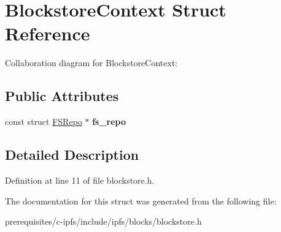 \hypertarget{struct_blockstore_context}{}\section{Blockstore\+Context Struct Reference}
\label{struct_blockstore_context}


Collaboration diagram for Blockstore\+Context\+:
\subsection*{Public Attributes}
\begin{DoxyCompactItemize}
\item 
\mbox{\label{struct_blockstore_context_a07933e8c49b3371908be524cdc0e848b}} 
const struct \mbox{\hyperlink{struct_f_s_repo}{F\+S\+Repo}} $\ast$ {\bfseries fs\+\_\+repo}
\end{DoxyCompactItemize}


\subsection{Detailed Description}


Definition at line 11 of file blockstore.\+h.



The documentation for this struct was generated from the following file\+:\begin{DoxyCompactItemize}
\item 
prerequisites/c-\/ipfs/include/ipfs/blocks/blockstore.\+h\end{DoxyCompactItemize}
